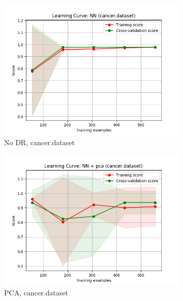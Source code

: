 \documentclass{article}
\begin{document}
    \begin{figure}[htb]
    \centering

      \begin{subfigure}{0.33\textwidth}
        \includegraphics[width=\linewidth]{out/nn_dr/cancer-learning.png}
        \caption{No DR, cancer.dataset}
      \end{subfigure}\hfil
      \begin{subfigure}{0.33\textwidth}
        \includegraphics[width=\linewidth]{out/nn_dr/cancer-pca-learning.png}
        \caption{PCA, cancer.dataset}
      \end{subfigure}\hfil
      \begin{subfigure}{0.33\textwidth}

\end{subfigure}
\end{figure}
\end{document}
